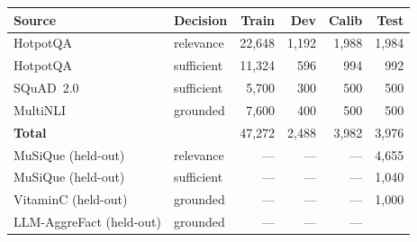 \begin{tabular}{llrrrr}
\toprule
\textbf{Source} & \textbf{Decision} & \textbf{Train} & \textbf{Dev} & \textbf{Calib} & \textbf{Test} \\
\midrule
HotpotQA & relevance & 22,648 & 1,192 & 1,988 & 1,984 \\
HotpotQA & sufficient & 11,324 & 596 & 994 & 992 \\
SQuAD~2.0 & sufficient & 5,700 & 300 & 500 & 500 \\
MultiNLI & grounded & 7,600 & 400 & 500 & 500 \\
\midrule
\textbf{Total} & & 47,272 & 2,488 & 3,982 & 3,976 \\
\midrule
MuSiQue (held-out) & relevance & --- & --- & --- & 4,655 \\
MuSiQue (held-out) & sufficient & --- & --- & --- & 1,040 \\
VitaminC (held-out) & grounded & --- & --- & --- & 1,000 \\
LLM-AggreFact (held-out) & grounded & --- & --- & --- & \ph{--} \\
\bottomrule
\end{tabular}
